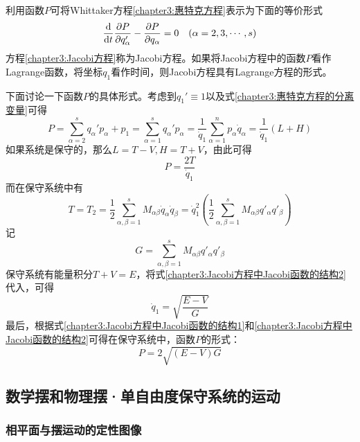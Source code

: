 利用函数$P$可将Whittaker方程\eqref{chapter3:惠特克方程}表示为下面的等价形式
\begin{equation}
	\frac{\mathrm{d}}{\mathrm{d} t}\frac{\partial P}{\partial q_\alpha'} - \frac{\partial P}{\partial q_\alpha} = 0\quad (\alpha=2,3,\cdots,s)
	\label{chapter3:Jacobi方程}
\end{equation}
方程\eqref{chapter3:Jacobi方程}称为Jacobi方程。如果将Jacobi方程中的函数$P$看作Lagrange函数，将坐标$q_1$看作时间，则Jacobi方程具有Lagrange方程的形式。

下面讨论一下函数$P$的具体形式。考虑到$q_1'\equiv 1$以及式\eqref{chapter3:惠特克方程的分离变量}可得
\begin{equation}
	P = \sum_{\alpha=2}^sq_\alpha'p_\alpha+p_1 = \sum_{\alpha=1}^s q_\alpha'p_\alpha = \frac{1}{\dot{q}_1} \sum_{\alpha=1}^n p_\alpha\dot{q}_\alpha = \frac{1}{\dot{q}_1}(L+H)
\end{equation}
如果系统是保守的，那么$L=T-V, H=T+V$，由此可得
\begin{equation}
	P = \frac{2T}{\dot{q}_1}
	\label{chapter3:Jacobi方程中Jacobi函数的结构1}
\end{equation}
而在保守系统中有
\begin{equation}
	T = T_2 = \frac12 \sum_{\alpha,\beta=1}^s M_{\alpha\beta}\dot{q}_\alpha\dot{q}_\beta = \dot{q}_1^2 \left(\frac12 \sum_{\alpha,\beta=1}^s M_{\alpha\beta}q'_\alpha q'_\beta\right)
	\label{chapter3:Jacobi方程中Jacobi函数的结构2}
\end{equation}
记
\begin{equation}
	G = \sum_{\alpha,\beta=1}^s M_{\alpha\beta}q'_\alpha q'_\beta
\end{equation}
保守系统有能量积分$T+V=E$，将式\eqref{chapter3:Jacobi方程中Jacobi函数的结构2}代入，可得
\begin{equation*}
	\dot{q}_1 = \sqrt{\frac{E-V}{G}}
\end{equation*}
最后，根据式\eqref{chapter3:Jacobi方程中Jacobi函数的结构1}和\eqref{chapter3:Jacobi方程中Jacobi函数的结构2}可得在保守系统中，函数$P$的形式：
\begin{equation}
	P = 2\sqrt{(E-V)G}
\end{equation}

\subsection{数学摆和物理摆·单自由度保守系统的运动}\label{chapter3:subsection-数学摆和物理摆·单自由度保守系统的运动}

\subsubsection{相平面与摆运动的定性图像}

